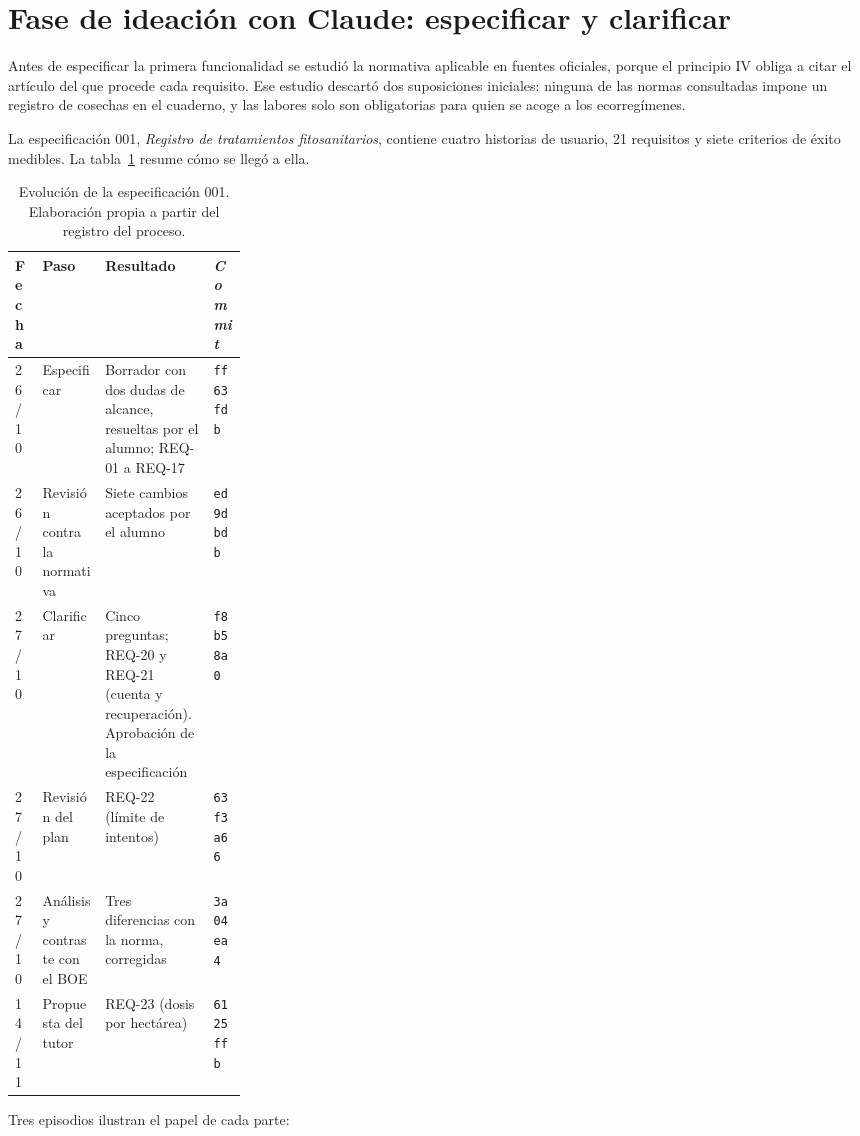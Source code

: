 \section{Fase de ideación con Claude: especificar y clarificar}\label{sec:Ideacion}

Antes de especificar la primera funcionalidad se estudió la normativa aplicable en fuentes oficiales, porque el principio IV obliga a citar el artículo del que procede cada requisito. Ese estudio descartó dos suposiciones iniciales: ninguna de las normas consultadas impone un registro de cosechas en el cuaderno, y las labores solo son obligatorias para quien se acoge a los ecorregímenes.

La especificación 001, \emph{Registro de tratamientos fitosanitarios}, contiene cuatro historias de usuario, 21 requisitos y siete criterios de éxito medibles. La tabla~\ref{tab:IteracionesSpec} resume cómo se llegó a ella.

\begin{table}[htbp]
	\centering
	\small
	\caption{Evolución de la especificación 001. Elaboración propia a partir del registro del proceso.}
	\label{tab:IteracionesSpec}
	\begin{tabularx}{\linewidth}{@{}l>{\raggedright\arraybackslash}p{0.27\linewidth}>{\raggedright\arraybackslash}Xl@{}}
		\toprule
		\textbf{Fecha} & \textbf{Paso} & \textbf{Resultado} & \textbf{\emph{Commit}} \\
		\midrule
		26/10 & Especificar & Borrador con dos dudas de alcance, resueltas por el alumno; REQ-01 a REQ-17 & \texttt{ff63fdb} \\
		26/10 & Revisión contra la normativa & Siete cambios aceptados por el alumno & \texttt{ed9dbdb} \\
		27/10 & Clarificar & Cinco preguntas; REQ-20 y REQ-21 (cuenta y recuperación). Aprobación de la especificación & \texttt{f8b58a0} \\
		27/10 & Revisión del plan & REQ-22 (límite de intentos) & \texttt{63f3a66} \\
		27/10 & Análisis y contraste con el BOE & Tres diferencias con la norma, corregidas & \texttt{3a04ea4} \\
		14/11 & Propuesta del tutor & REQ-23 (dosis por hectárea) & \texttt{6125ffb} \\
		\bottomrule
	\end{tabularx}
\end{table}

Tres episodios ilustran el papel de cada parte:

